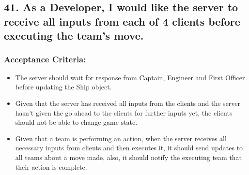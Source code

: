 \subsection*{41. As a Developer, I would like the server to receive all inputs from each of 4 clients before executing the team's move.}


\subsubsection*{Acceptance Criteria:}

\begin{itemize}
\item The server should wait for response from Captain, Engineer and First Officer before updating the Ship object.
\item Given that the server has received all inputs from the clients and the server hasn't given the go ahead to the clients for further inputs yet, the clients should not be able to change game state.
\item Given that a team is performing an action, when the server receives all necessary inputs from clients and then executes it, it should send updates to all teams about a move made, also, it should notify the executing team that their action is complete.
\end{itemize}
